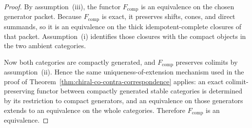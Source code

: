 \begin{proof}
By assumption~\textup{(iii)}, the functor
$F_{\mathrm{comp}}$ is an equivalence on the chosen generator packet.
Because $F_{\mathrm{comp}}$ is exact, it preserves shifts, cones, and
direct summands, so it is an equivalence on the thick idempotent-complete
closures of that packet. Assumption~\textup{(i)} identifies those
closures with the compact objects in the two ambient categories.

Now both categories are compactly generated, and
$F_{\mathrm{comp}}$ preserves colimits by assumption~\textup{(ii)}.
Hence the same uniqueness-of-extension mechanism used in the proof of
Theorem~\ref{thm:chiral-co-contra-correspondence} applies: an exact
colimit-preserving functor between compactly generated stable
categories is determined by its restriction to compact generators, and
an equivalence on those generators extends to an equivalence on the
whole categories. Therefore $F_{\mathrm{comp}}$ is an equivalence.
\end{proof}

